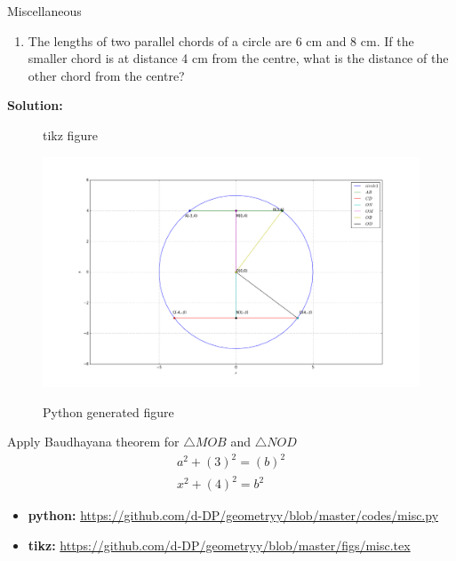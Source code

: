 \begin{frame}{Miscellaneous}
\begin{enumerate}
\conti
\item The lengths of two parallel chords of a circle are 6 cm and 8 cm. If the smaller chord is
at distance 4 cm from the centre, what is the
distance of the other chord from the centre?
\seti
\end{enumerate}
\textbf{Solution:} 
\begin{figure}[!ht]
\resizebox{0.45\linewidth}{!}
{

}
\caption{tikz figure}
\label{fig:foo}
\end{figure}
\end{frame}
\begin{frame}
\begin{figure}[!ht]
\resizebox{0.45\linewidth}{!}
{
\includegraphics[scale=1.2]{./figs/misc.png}
}
\caption{Python generated figure}
\label{fig:foo}
\end{figure}
Apply Baudhayana theorem for $\triangle{MOB}$ and $\triangle{NOD}$
\begin{align*}
a^2+(3)^2=(b)^2 \\
x^2+(4)^2=b^2
\end{align*}
\begin{itemize}
\item \textbf{python:} \url{https://github.com/d-DP/geometryy/blob/master/codes/misc.py}
\item \textbf{tikz:} \url{https://github.com/d-DP/geometryy/blob/master/figs/misc.tex}
\end{itemize}
\end{frame}